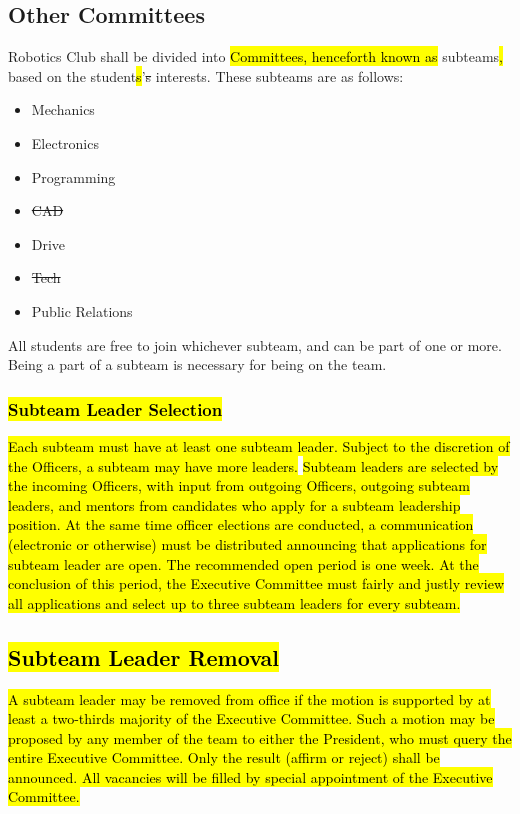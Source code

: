 \documentclass[12pt, a4paper]{article}
\begin{document}
\subsection{Other Committees}
Robotics Club shall be divided into \hl{Committees, henceforth known as }subteams\hl{,} based on the student\hl{s}’\st{s} interests. These subteams are as follows:
\begin{itemize}
\item Mechanics
\item Electronics
\item Programming
\item \st{CAD}
\item Drive
\item \st{Tech}
\item Public Relations
\end{itemize}
All students are free to join whichever subteam, and can be part of one or more. Being a part of a subteam is necessary for being on the team.

\subsubsection{\hl{Subteam Leader Selection}}
\hl{Each subteam must have at least one subteam leader. 
Subject to the discretion of the Officers, a subteam may have more leaders.} \newline
\hl{Subteam leaders are selected by the incoming Officers, with input from outgoing Officers, outgoing subteam leaders, and mentors from candidates who apply for a subteam leadership position. 
At the same time officer elections are conducted, a communication (electronic or otherwise) must be distributed announcing that applications for subteam leader are open. 
The recommended open period is one week. 
At the conclusion of this period, the Executive Committee must fairly and justly review all applications and select up to three subteam leaders for every subteam. 
}


\subsection{\hl{Subteam Leader Removal}}
\hl{A subteam leader may be removed from office if the motion is supported by at least a two-thirds majority of the Executive Committee. Such a motion may be proposed by any member of the team to either the President, who must query the entire Executive Committee. Only the result (affirm or reject) shall be announced. All vacancies will be filled by special appointment of the Executive Committee.
}
\end{document}

